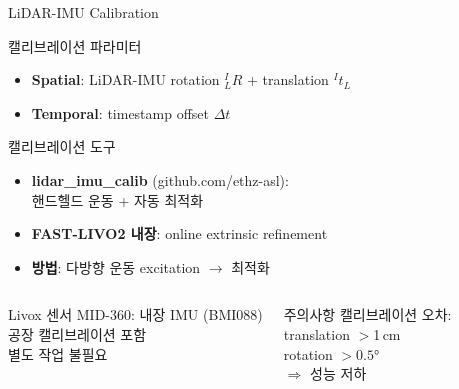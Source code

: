 \begin{frame}{LiDAR-IMU Calibration}
  \begin{block}{캘리브레이션 파라미터}
    \begin{itemize}
      \item \textbf{Spatial}: LiDAR-IMU rotation ${}^I_LR$ + translation ${}^It_L$
      \item \textbf{Temporal}: timestamp offset $\Delta t$
    \end{itemize}
  \end{block}
  \pause
  \begin{block}{캘리브레이션 도구}
    \begin{itemize}
      \item \textbf{lidar\_imu\_calib} (github.com/ethz-asl):\\
        핸드헬드 운동 + 자동 최적화
      \item \textbf{FAST-LIVO2 내장}: online extrinsic refinement
      \item \textbf{방법}: 다방향 운동 excitation $\to$ 최적화
    \end{itemize}
  \end{block}
  \pause
  \begin{columns}
    \begin{exampleblock}{Livox 센서}
      MID-360: 내장 IMU (BMI088)\\
      공장 캘리브레이션 포함\\
      별도 작업 불필요
    \end{exampleblock}
    \begin{alertblock}{주의사항}
      캘리브레이션 오차:\\
      translation $>$1\,cm\\
      rotation $>0.5°$\\
      $\Rightarrow$ 성능 저하
    \end{alertblock}
  \end{columns}
\end{frame}

